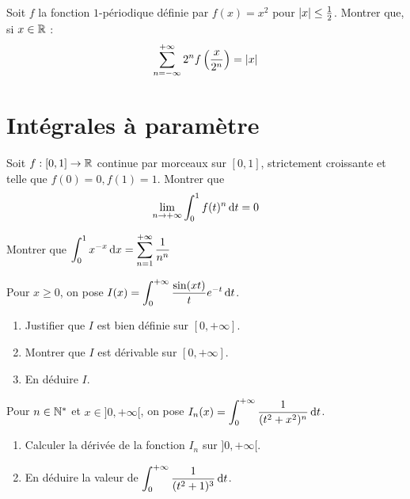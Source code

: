 \documentclass[12pt,a4paper]{exo_book}
\begin{document}
\begin{exo}
    Soit $f$ la fonction $1$-périodique définie par $f(x) = x^{2}$ pour $\left|x\right| \leq \frac{1}{2}$. Montrer que, si $x \in \mathbb{R}$ :
    \[
        \sum_{n = -\infty}^{+\infty} 2^{n}f\left(\frac{x}{2^{n}}\right) = \left|x\right|
    \]
\end{exo}


\chapter{Intégrales à paramètre}

\begin{exo}
    Soit $f : [0,1] \to \mathbb{R}$ continue par morceaux sur $[0,1]$, strictement croissante et telle que $f(0) = 0, f(1) = 1$. Montrer que
    \[\lim_{n\to+\infty} \int_0^1 f(t)^n {\rm \, d} t = 0\]
\end{exo}

\begin{exo}
    Montrer que $\displaystyle \int_0^1 x^{-x} {\rm \, d} x = \sum_{n=1}^{+\infty} \frac{1}{n^n}$
\end{exo}

\begin{exo}
    Pour $x \ge 0$, on pose $\displaystyle I(x) = \int_0^{+\infty} \frac{\sin(xt)}{t} e^{-t} {\rm \, d} t$.

    \begin{enumerate}
        \item Justifier que $I$ est bien définie sur $[0, +\infty]$.
        \item Montrer que $I$ est dérivable sur $[0, +\infty]$.
        \item En déduire $I$.
    \end{enumerate}
\end{exo}

\begin{exo}
    Pour $n \in \mathbb{N}^*$ et $x \in ]0,+\infty[$, on pose $\displaystyle I_n (x) = \int_0^{+\infty} \frac{1}{(t^2 + x^2)^n} {\rm \, d} t$.
    \begin{enumerate}
        \item Calculer la dérivée de la fonction $I_n$ sur $]0, +\infty[$.
        \item En déduire la valeur de $\displaystyle \int_0^{+\infty} \frac{1}{(t^2 + 1)^3} {\rm \, d} t$.
    \end{enumerate}
\end{exo}
\end{document}
